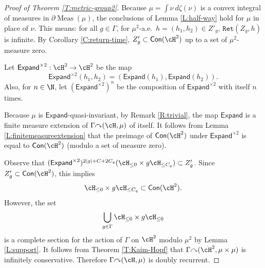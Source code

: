 \documentclass[12pt]{article}
\theoremstyle{plain}
\newtheorem{cor}[thm]{Corollary}
\theoremstyle{definition}
\theoremstyle{remark}
\newcommand{\G}{\Gamma}
\newcommand\z{\zeta}
\newcommand\Expand{{\mathsf{Expand}}}
\newcommand\Meas{{\operatorname{Meas}}}
\newcommand\Ret{\mathtt{Ret}}
\def\cc{{\curvearrowright}}
\begin{document}
    



\begin{proof}[Proof of Theorem \ref{T:metric-group2}]


 Because $\mu=\int \nu ~d\zeta(\nu)$ is a convex integral of measures in $\partial \Meas(\mu)$, the conclusions of Lemma \ref{L:half-way} hold for $\mu$ in place of $\nu$. This means: for all $g\in \G$, for $\mu^2$-a.e.\ $h=(h_1,h_2)\in Z'_g$, $\Ret(Z_g, h)$ is infinite. By
Corollary \ref{C:return-time}, $Z'_g \subset \mathsf{Con}(\cH^2)$  up to a set of $\mu^2$-measure zero.

Let $\mathsf{Expand}^{\times 2}:\cH^2 \to \cH^2$ be the map
$$\mathsf{Expand}^{\times 2}(h_1,h_2) = (\mathsf{Expand}(h_1),\mathsf{Expand}(h_2)).$$
Also, for $n\in \N$, let $(\mathsf{Expand}^{\times 2})^n$ be the composition of $\mathsf{Expand}^{\times 2}$ with itself $n$ times.

Because $\mu$ is $\Expand$-quasi-invariant, by Remark \ref{R:trivial}, the map $\mathsf{Expand}$ is a finite measure extension of $\G \cc (\cH,\mu)$ of itself.  It follows from Lemma \ref{L:finitemeasureextension} that the preimage  of $\mathsf{Con}(\cH^2)$ under $\mathsf{Expand}^{\times 2}$ is equal to $\mathsf{Con}(\cH^2)$ (modulo a set of measure zero). 




Observe that $(\mathsf{Expand}^{\times 2})^{2|g|+C+2C_q}(\cH_{\leq 0} \times g\cH_{\leq C_q}) \subset Z'_g$. Since $Z'_g \subset \mathsf{Con}(\cH^2)$, this implies
$$\cH_{\leq 0} \times g\cH_{\leq C_q}\subset \mathsf{Con}(\cH^2).$$
However, the set 
$$\bigcup_{g\in \G} \cH_{\leq 0} \times g\cH_{\leq 0}$$
is a complete section for the action of $\G$ on $\cH^2$ modulo $\mu^2$ by Lemma \ref{L:support}.  It follows from Theorem \ref{T:Kaim-Hopf} that $\G \cc (\cH^2,\mu\times \mu)$ is infinitely conservative. Therefore $\G \cc (\cH,\mu)$ is doubly recurrent. 
\end{proof}
\end{document}
